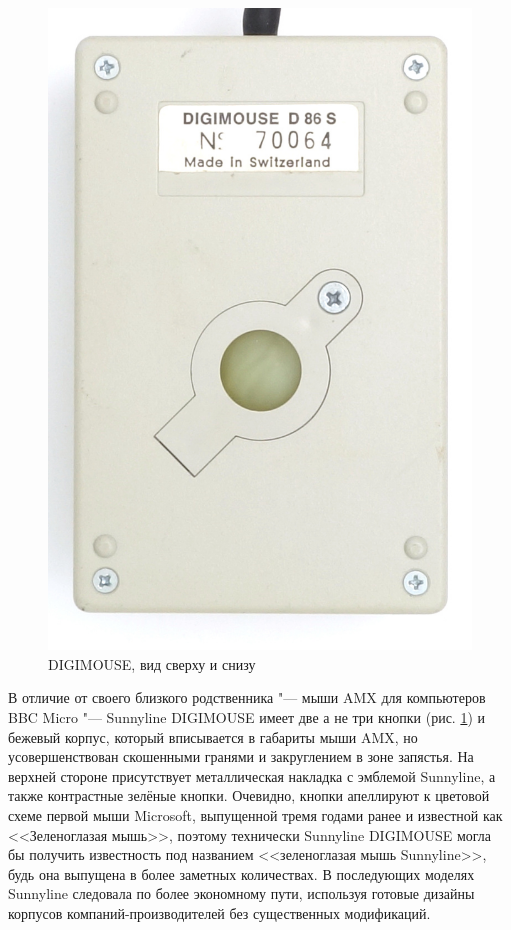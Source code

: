 \documentclass[11pt, a4paper]{article}
\begin{document}
\begin{figure}[h]
    \includegraphics[scale=0.8]{1986_sunnyline_digimouse/bottom_30.jpg}
    \caption{DIGIMOUSE, вид сверху и снизу}
    \label{fig:SunnylineDIGIMOUSETopAndBottom}
\end{figure}

В отличие от своего близкого родственника "--- мыши AMX для компьютеров BBC Micro "--- Sunnyline DIGIMOUSE имеет две а не три кнопки (рис. \ref{fig:SunnylineDIGIMOUSETopAndBottom}) и бежевый корпус, который вписывается в габариты мыши AMX, но усовершенствован скошенными гранями и закруглением в зоне запястья. На верхней стороне присутствует металлическая накладка с эмблемой Sunnyline, а также контрастные зелёные кнопки. Очевидно, кнопки апеллируют к цветовой схеме первой мыши Microsoft, выпущенной тремя годами ранее и известной как <<Зеленоглазая мышь>>, поэтому технически Sunnyline DIGIMOUSE могла бы получить известность под названием <<зеленоглазая мышь Sunnyline>>, будь она выпущена в более заметных количествах.
В последующих моделях Sunnyline следовала по более экономному пути, используя готовые дизайны корпусов компаний-производителей без существенных модификаций.
\end{document}

